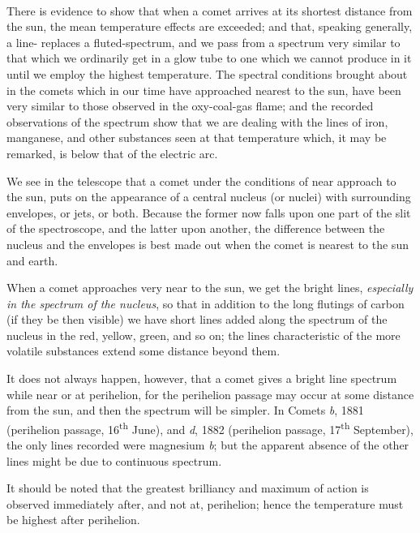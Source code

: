 \documentclass[a4paper, 12pt, oneside, polutonikogreek, english]{article}
\begin{document}
\paragraph{}
There is evidence to show that when a comet arrives at its shortest distance from the sun, the mean temperature effects are exceeded; and that, speaking generally, a line- replaces a fluted-spectrum, and we pass from a spectrum very similar to that which we ordinarily get in a glow tube to one which we cannot produce in it until we employ the highest temperature. The spectral conditions brought about in the comets which in our time have approached nearest to the sun, have been very similar to those observed in the oxy-coal-gas flame; and the recorded observations of the spectrum show that we are dealing with the lines of iron, manganese, and other substances seen at that temperature which, it may be remarked, is below that of the electric arc.

We see in the telescope that a comet under the conditions of near approach to the sun, puts on the appearance of a central nucleus (or nuclei) with surrounding envelopes, or jets, or both. Because the former now falls upon one part of the slit of the spectroscope, and the latter upon another, the difference between the nucleus and the envelopes is best made out when the comet is nearest to the sun and earth.

When a comet approaches very near to the sun, we get the bright lines, \emph{especially in the spectrum of the nucleus}, so that in addition to the long flutings of carbon (if they be then visible) we have short lines added along the spectrum of the nucleus in the red, yellow, green, and so on; the lines characteristic of the more volatile substances extend some distance beyond them.

It does not always happen, however, that a comet gives a bright line spectrum while near or at perihelion, for the perihelion passage may occur at some distance from the sun, and then the spectrum will be simpler. In Comets \emph{b}, 1881 (perihelion passage, 16\textsuperscript{th} June), and \emph{d}, 1882 (perihelion passage, 17\textsuperscript{th} September), the only lines recorded were magnesium \emph{b}; but the apparent absence of the other lines might be due to continuous spectrum.

It should be noted that the greatest brilliancy and maximum of action is observed immediately after, and not at, perihelion; hence the temperature must be highest after perihelion.
\end{document}
